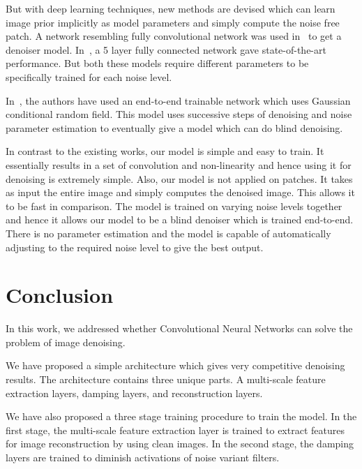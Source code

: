 \documentclass[10pt,twocolumn,letterpaper]{proc}
\begin{document}
But with deep learning techniques, new methods are devised which can learn image prior implicitly as model parameters and simply compute the noise free patch.  A network resembling fully convolutional network was used in~\cite{NIPS2008_3506} to get a denoiser model. In~\cite{burger2012image}, a 5 layer fully connected network gave state-of-the-art performance. But both these models require different parameters to be specifically trained for each noise level. 


In~\cite{Vemulapalli_2016_CVPR}, the authors have used an end-to-end trainable network which uses Gaussian conditional random field. This model uses successive steps of denoising and noise parameter estimation to eventually give a model which can do blind denoising.

In contrast to the existing works, our model is simple and easy to train. 
It essentially results in a set of convolution and non-linearity and hence using it for denoising is extremely simple. Also, our model is not applied on patches. It takes as input the entire image and simply computes the denoised image. This allows it to be fast in comparison. 
The model is trained on varying noise levels together and hence it allows our model to be a  blind denoiser which is trained end-to-end. There is no parameter estimation and the model is capable of automatically adjusting to the required noise level to give the best output.

%    
    
\section{Conclusion}\label{sec:conclusion}
%    

In this work, we addressed whether Convolutional Neural Networks can solve the problem of image denoising.

We have proposed a simple architecture which gives very competitive denoising results.
The architecture contains three unique parts. A multi-scale feature extraction layers, damping layers, and reconstruction layers. 

We have also proposed a three stage training procedure to train the model.
In the first stage, the multi-scale feature extraction layer is trained to extract features for image reconstruction by using clean images.
In the second stage, the damping layers are trained to diminish activations of noise variant filters.
\end{document}

